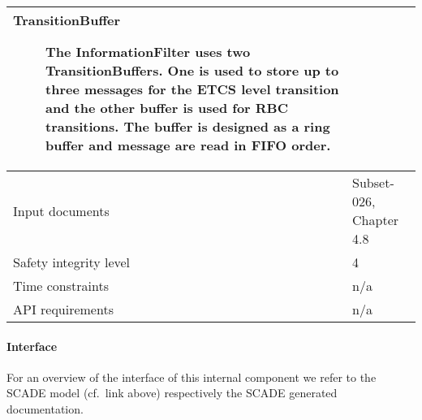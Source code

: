 \begin{longtable}{p{}p{}}
\begin{description}
\item[TransitionBuffer] The InformationFilter uses two
TransitionBuffers. One is used to store up to three messages for the
ETCS level transition and the other buffer is used for RBC
transitions. The buffer is designed as a ring buffer and message are
read in FIFO order.
\end{description} \\
\midrule
Input documents	& 
  Subset-026, Chapter 4.8 \\
\midrule
Safety integrity level	& 4 \\
\midrule
Time constraints		& n/a \\
\midrule
API requirements 		& n/a \\
\bottomrule
\end{longtable}


\paragraph{Interface}

For an overview of the interface of this internal component we refer to the SCADE model (cf.~link above) respectively the SCADE generated documentation.